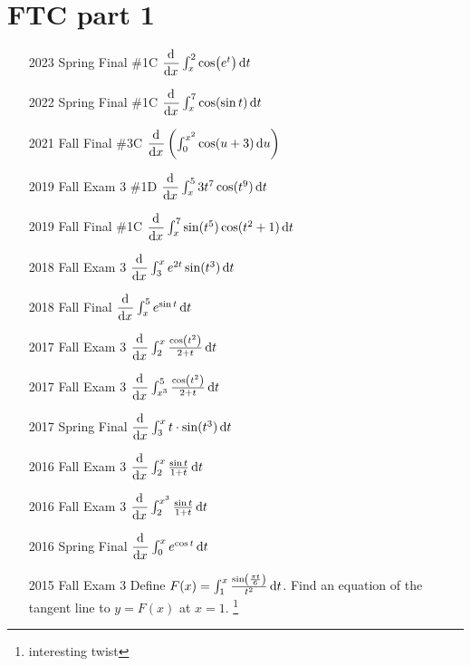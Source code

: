 \documentclass[10pt]{scrartcl}
\theoremstyle{definition}
\begin{document}
\section{FTC part 1}
\begin{enumerate}
\item[2023 Spring Final \#1C] $\dod{}{x} \int_x^2 \cos(e^t) \dif t$
\item[2022 Spring Final \#1C] $\dod{}{x} \int_x^7 \cos(\sin t)\dif t$
\item[2021 Fall Final \#3C] $\dod{}{x} \left( \int_0^{x^2} \cos(u+3) \dif u \right)$
\item [2019 Fall Exam 3 \#1D] $\dod{}{x} \int_x^5 3t^7 \cosine(t^9)\dif t$
\item [2019 Fall Final \#1C] $\dod{}{x} \int_x^7 \sine(t^5) \cosine(t^2+1) \dif t$
\item [2018 Fall Exam 3] $\dod{}{x} \int_3^x e^{2t} \sine(t^3) \dif t$
\item [2018 Fall Final] $\dod{}{x}\int_x^5 e^{\sin t} \dif t$
\item [2017 Fall Exam 3] $\dod{}{x} \int_2^x \frac{\cos(t^2)}{2+t} \dif t$
\item [2017 Fall Exam 3] $\dod{}{x} \int_{x^3}^5 \frac{\cos(t^2)}{2+t} \dif t$
\item [2017 Spring Final] $\dod{}{x} \int_3^x t \cdot \sine(t^3) \dif t$
\item [2016 Fall Exam 3] $\dod{}{x} \int_2^x \frac{\sin t}{1+t} \dif t$
\item [2016 Fall Exam 3] $\dod{}{x} \int_2^{x^3} \frac{\sin t}{1+t} \dif t$
\item [2016 Spring Final] $\dod{}{x} \int_0^x e^{\cos t} \dif t$
\item [2015 Fall Exam 3] Define $F(x) = \int_1^x \frac{\sin(\frac{\pi t}{6})}{t^2} \dif t$. Find an equation of the tangent line to $y = F(x)$ at $x = 1$. \footnote{interesting twist}
\end{enumerate}
\end{document}
